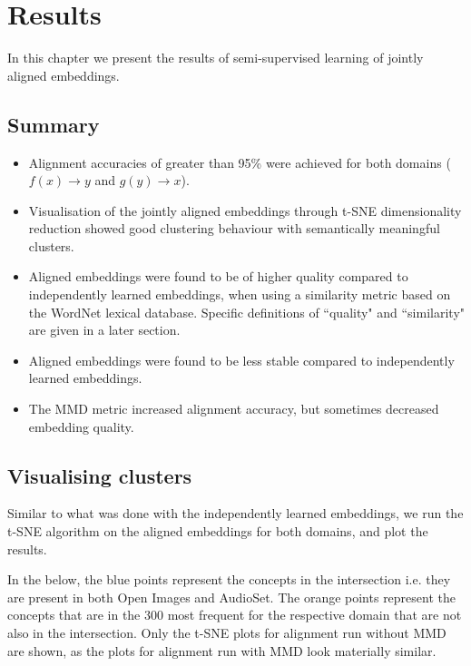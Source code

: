 \chapter{Results}

In this chapter we present the results of semi-supervised learning of jointly aligned embeddings.


\section{Summary}
\begin{itemize}
    \item Alignment accuracies of greater than 95\% were achieved for both domains ($f(x) \rightarrow y$ and $g(y) \rightarrow x$).
    \item Visualisation of the jointly aligned embeddings through t-SNE dimensionality reduction showed good clustering behaviour with semantically meaningful clusters.
    \item Aligned embeddings were found to be of higher quality compared to independently learned embeddings, when using a similarity metric based on the WordNet lexical database. Specific definitions of ``quality" and ``similarity" are given in a later section.
    \item Aligned embeddings were found to be less stable compared to independently learned embeddings. 
    \item The MMD metric increased alignment accuracy, but sometimes decreased embedding quality. 
\end{itemize}


\section{Visualising clusters}
Similar to what was done with the independently learned embeddings, we run the t-SNE algorithm on the aligned embeddings for both domains, and plot the results.

In the below, the blue points represent the concepts in the intersection i.e. they are present in both Open Images and AudioSet. The orange points represent the concepts that are in the 300 most frequent for the respective domain that are not also in the intersection. Only the t-SNE plots for alignment run without MMD are shown, as the plots for alignment run with MMD look materially similar. 

